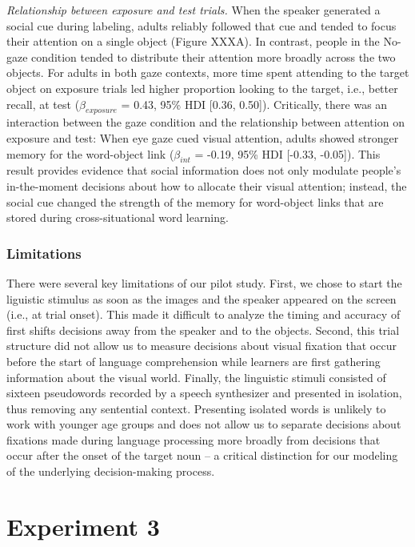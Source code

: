 \documentclass[man,floatsintext]{apa6}
\begin{document}
\emph{Relationship between exposure and test trials.} When the speaker
generated a social cue during labeling, adults reliably followed that
cue and tended to focus their attention on a single object (Figure
XXXA). In contrast, people in the No-gaze condition tended to distribute
their attention more broadly across the two objects. For adults in both
gaze contexts, more time spent attending to the target object on
exposure trials led higher proportion looking to the target, i.e.,
better recall, at test (\(\beta_{exposure}\) = 0.43, 95\% HDI {[}0.36,
0.50{]}). Critically, there was an interaction between the gaze
condition and the relationship between attention on exposure and test:
When eye gaze cued visual attention, adults showed stronger memory for
the word-object link (\(\beta_{int}\) = -0.19, 95\% HDI {[}-0.33,
-0.05{]}). This result provides evidence that social information does
not only modulate people's in-the-moment decisions about how to allocate
their visual attention; instead, the social cue changed the strength of
the memory for word-object links that are stored during
cross-situational word learning.

\subsubsection{Limitations}\label{limitations}

There were several key limitations of our pilot study. First, we chose
to start the liguistic stimulus as soon as the images and the speaker
appeared on the screen (i.e., at trial onset). This made it difficult to
analyze the timing and accuracy of first shifts decisions away from the
speaker and to the objects. Second, this trial structure did not allow
us to measure decisions about visual fixation that occur before the
start of language comprehension while learners are first gathering
information about the visual world. Finally, the linguistic stimuli
consisted of sixteen pseudowords recorded by a speech synthesizer and
presented in isolation, thus removing any sentential context. Presenting
isolated words is unlikely to work with younger age groups and does not
allow us to separate decisions about fixations made during language
processing more broadly from decisions that occur after the onset of the
target noun -- a critical distinction for our modeling of the underlying
decision-making process.

\section{Experiment 3}\label{experiment-3}
\end{document}
